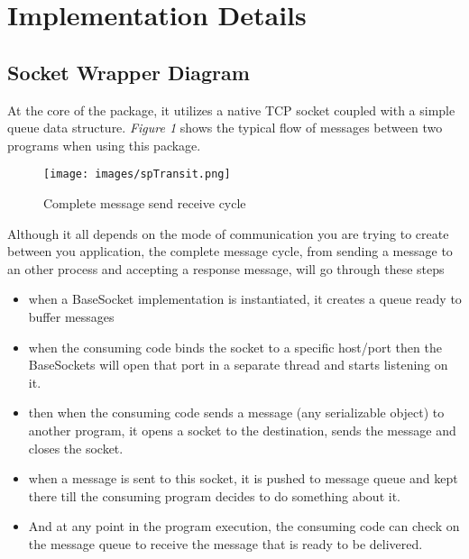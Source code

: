 \documentclass[11pt,journal,compsoc]{IEEEtran}
\begin{document}
\section{Implementation Details}


\subsection{Socket Wrapper Diagram}

At the core of the package, it utilizes a native TCP socket coupled with a simple queue data structure. \emph{Figure 1} shows the typical flow of messages between two programs when using this package.


\begin{figure*}[!t]
\centering
\texttt{[image: images/spTransit.png]}
\caption{Complete message send receive cycle}
\label{fig_sim}
\end{figure*}



Although it all depends on the mode of communication you are trying to create between you application, the complete message cycle, from sending a message to an other process and accepting a response message, will go through these steps

\begin{itemize}

\item when a BaseSocket implementation is instantiated, it creates a queue ready to buffer messages

\item when the consuming code binds the socket to a specific host/port then the BaseSockets will open that port in a separate thread and starts listening on it.


\item then when the consuming code sends a message (any serializable object) to another program, it opens a socket to the destination, sends the message and closes the socket.

\item when a message is sent to this socket, it is pushed to message queue and kept there till the consuming program decides to do something about it.

\item And at any point in the program execution, the consuming code can check on the message queue to receive the message that is ready to be delivered.
\end{itemize}
\end{document}

